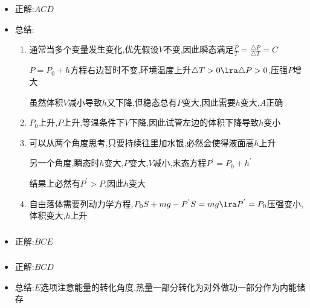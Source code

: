 \documentclass{article}
\begin{document}
\subsubsection{}
\begin{itemize}
    \item 正解:\quad $ACD$
    \item 总结:\quad

          \hspace{3em}\begin{minipage}{0.88\textwidth}
              \begin{enumerate}[label = (\Alph*)]
                  \item 通常当多个变量发生变化,优先假设$V$不变,因此瞬态满足$\frac{P}{T} = \frac{\triangle P}{\triangle T} = C$

                        $P = P_{0} + h$方程右边暂时不变,环境温度上升$\triangle T > 0 \lra \triangle P > 0$,压强$P$增大

                        虽然体积$V$减小导致$h$又下降,但稳态总有$P$变大,因此需要$h$变大,$A$正确
                  \item $P_{0}$上升,$P$上升,等温条件下$V$下降,因此试管左边的体积下降导致$h$变小
                  \item 可以从两个角度思考,只要持续往里加水银,必然会使得液面高$h$上升

                        另一个角度,瞬态时$h$变大,$P$变大,$V$减小,末态方程$P^{'} = P_{0} + h^{'}$

                        结果上必然有$P^{'}>P$,因此$h$变大
                  \item 自由落体需要列动力学方程,$P_{0}S + mg - P^{'}S = mg \lra P^{'} = P_{0}$压强变小,体积变大,$h$上升
              \end{enumerate}
          \end{minipage}
\end{itemize}

\vspace{2em}

\subsubsection{}
\begin{itemize}
    \item 正解:\quad $BCE$
\end{itemize}

\vspace{2em}

\subsubsection{}
\begin{itemize}
    \item 正解:\quad $BCD$
    \item 总结:\quad $E$选项注意能量的转化角度,热量一部分转化为对外做功一部分作为内能储存
\end{itemize}
\end{document}
